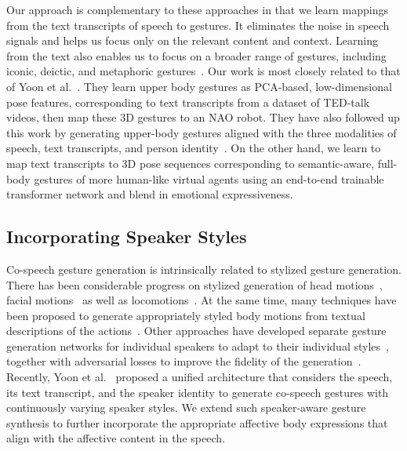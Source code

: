 \documentclass[conference,compsoc]{IEEEtran}
\theoremstyle{definition}
\begin{document}
Our approach is complementary to these approaches in that we learn mappings from the text transcripts of speech to gestures. It eliminates the noise in speech signals and helps us focus only on the relevant content and context. Learning from the text also enables us to focus on a broader range of gestures, including iconic, deictic, and metaphoric gestures~\cite{gestures_in_comm}. Our work is most closely related to that of Yoon et al.~\cite{cospeech_gestures}. They learn upper body gestures as PCA-based, low-dimensional pose features, corresponding to text transcripts from a dataset of TED-talk videos, then map these 3D gestures to an NAO robot. They have also followed up this work by generating upper-body gestures aligned with the three modalities of speech, text transcripts, and person identity~\cite{trimodal}. On the other hand, we learn to map text transcripts to 3D pose sequences corresponding to semantic-aware, full-body gestures of more human-like virtual agents using an end-to-end trainable transformer network and blend in emotional expressiveness.

\subsection{Incorporating Speaker Styles}
Co-speech gesture generation is intrinsically related to stylized gesture generation. There has been considerable progress on stylized generation of head motions~\cite{head_motion_ae,head_gan}, facial motions~\cite{obamanet,expressive_face2} as well as locomotions~\cite{motion_editing,pfnn,nsm}. At the same time, many techniques have been proposed to generate appropriately styled body motions from textual descriptions of the actions~\cite{video_from_text,text_guided_pose}. Other approaches have developed separate gesture generation networks for individual speakers to adapt to their individual styles~\cite{individual_gesture_styles}, together with adversarial losses to improve the fidelity of the generation~\cite{multi_adversarial_gestures}. Recently, Yoon et al.~\cite{trimodal} proposed a unified architecture that considers the speech, its text transcript, and the speaker identity to generate co-speech gestures with continuously varying speaker styles. We extend such speaker-aware gesture synthesis to further incorporate the appropriate affective body expressions that align with the affective content in the speech.
\end{document}
